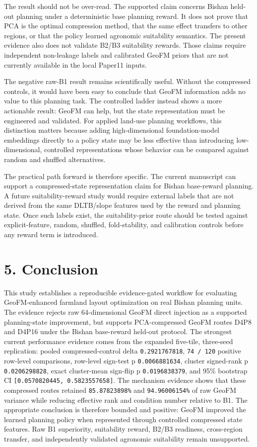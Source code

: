 \documentclass[
  11pt,
  a4paper,
]{article}
\begin{document}
The result should not be over-read. The supported claim concerns Bishan
held-out planning under a deterministic base planning reward. It does
not prove that PCA is the optimal compression method, that the same
effect transfers to other regions, or that the policy learned agronomic
suitability semantics. The present evidence also does not validate B2/B3
suitability rewards. Those claims require independent non-leakage labels
and calibrated GeoFM priors that are not currently available in the
local Paper11 inputs.

The negative raw-B1 result remains scientifically useful. Without the
compressed controls, it would have been easy to conclude that GeoFM
information adds no value to this planning task. The controlled ladder
instead shows a more actionable result: GeoFM can help, but the state
representation must be engineered and validated. For applied land-use
planning workflows, this distinction matters because adding
high-dimensional foundation-model embeddings directly to a policy state
may be less effective than introducing low-dimensional, controlled
representations whose behavior can be compared against random and
shuffled alternatives.

The practical path forward is therefore specific. The current manuscript
can support a compressed-state representation claim for Bishan
base-reward planning. A future suitability-reward study would require
external labels that are not derived from the same DLTB/slope features
used by the reward and planning state. Once such labels exist, the
suitability-prior route should be tested against explicit-feature,
random, shuffled, fold-stability, and calibration controls before any
reward term is introduced.

\section{5. Conclusion}\label{conclusion}

This study establishes a reproducible evidence-gated workflow for
evaluating GeoFM-enhanced farmland layout optimization on real Bishan
planning units. The evidence rejects raw 64-dimensional GeoFM direct
injection as a supported planning-state improvement, but supports
PCA-compressed GeoFM routes D4P8 and D4P16 under the Bishan base-reward
held-out protocol. The strongest current performance evidence comes from
the expanded five-tile, three-seed replication: pooled
compressed-control delta \texttt{0.2921767818}, \texttt{74\ /\ 120}
positive row-level comparisons, row-level sign-test p
\texttt{0.0066881634}, cluster signed-rank p \texttt{0.0206298828},
exact cluster-mean sign-flip p \texttt{0.0196838379}, and 95\% bootstrap
CI \texttt{{[}0.0570820445,\ 0.5823557658{]}}. The mechanism evidence
shows that these compressed routes retained \texttt{85.87823898\%} and
\texttt{94.96006154\%} of raw GeoFM variance while reducing effective
rank and condition number relative to B1. The appropriate conclusion is
therefore bounded and positive: GeoFM improved the learned planning
policy when represented through controlled compressed state features.
Raw B1 superiority, suitability reward, B2/B3 readiness, cross-region
transfer, and independently validated agronomic suitability remain
unsupported.
\end{document}
